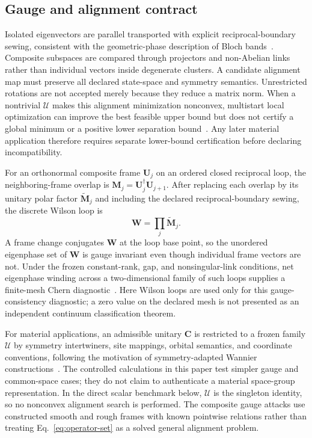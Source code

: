 \documentclass[preprint,12pt]{elsarticle}
\begin{document}
\subsection{Gauge and alignment contract}
\label{sec:gauge-alignment}

Isolated eigenvectors are parallel transported with explicit
reciprocal-boundary sewing, consistent with the geometric-phase description of
Bloch bands~\cite{resta1994,zak1989}. Composite subspaces are compared through
projectors and non-Abelian links rather than individual vectors inside
degenerate clusters. A candidate alignment map must preserve all declared
state-space and symmetry semantics. Unrestricted rotations are not accepted
merely because they reduce a matrix norm. When a nontrivial $\mathcal{U}$ makes
this alignment minimization nonconvex, multistart local optimization can improve
the best feasible upper bound but does not certify a global minimum or a
positive lower separation bound~\cite{nocedal2006}. Any later material
application therefore requires separate lower-bound certification before
declaring incompatibility.

For an orthonormal composite frame $\bm{U}_j$ on an ordered closed reciprocal
loop, the neighboring-frame overlap is
$\bm{M}_j=\bm{U}_j^\dagger\bm{U}_{j+1}$. After replacing each overlap by its
unitary polar factor $\widetilde{\bm{M}}_j$ and including the declared
reciprocal-boundary sewing, the discrete Wilson loop is
\[
 \bm{W}=\prod_j\widetilde{\bm{M}}_j.
\]
A frame change conjugates $\bm{W}$ at the loop base point, so the unordered
eigenphase set of $\bm{W}$ is gauge invariant even though individual frame
vectors are not. Under the frozen constant-rank, gap, and nonsingular-link
conditions, net eigenphase winding across a two-dimensional family of such
loops supplies a finite-mesh Chern diagnostic~\cite{resta1994,zak1989,thouless1982,niu1985}.
Here Wilson loops are used only for this gauge-consistency diagnostic; a zero
value on the declared mesh is not presented as an independent continuum
classification theorem.

For material applications, an admissible unitary $\bm{C}$ is restricted to a
frozen family $\mathcal{U}$ by symmetry intertwiners, site mappings, orbital
semantics, and coordinate conventions, following the motivation of
symmetry-adapted Wannier constructions~\cite{sakuma2013}. The controlled calculations in this paper test simpler gauge and common-space
cases; they do not claim to authenticate a material space-group
representation. In the direct scalar benchmark below, $\mathcal{U}$ is the
singleton identity, so no nonconvex alignment search is performed. The
composite gauge attacks use constructed smooth and rough frames with known
pointwise relations rather than treating Eq.~\eqref{eq:operator-set} as a
solved general alignment problem.
\end{document}

